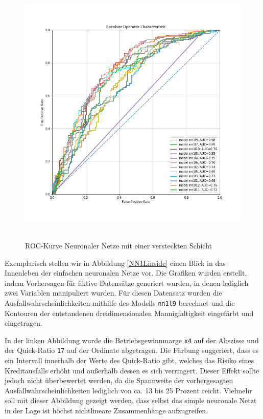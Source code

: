 \documentclass{article}
\begin{document}
\begin{center}
\begin{figure}[ht]
\centering
\caption{ROC-Kurve Neuronaler Netze mit einer versteckten Schicht}
\label{rocNN1L}
\includegraphics[width=15cm, height=13cm]{../rocNN1L.png}
\end{figure}
\end{center}


Exemplarisch stellen wir in Abbildung \ref{NN1Linside} einen Blick in das Innenleben der einfachen neuronalen Netze vor. Die Grafiken wurden erstellt, indem Vorhersagen f{\"u}r fiktive Datens{\"a}tze generiert wurden, in denen lediglich zwei Variablen manipuliert wurden. F{\"u}r diesen Datensatz wurden die Ausfallwahrscheinlichkeiten mithilfe des Modells \texttt{nn1l9} berechnet und die Kontouren der entstandenen dreidimensionalen Mannigfaltigkeit eingef{\"a}rbt und eingetragen.

In der linken Abbildung wurde die Betriebsgewinnmarge \texttt{x4} auf der Abszisse und der Quick-Ratio \texttt{17} auf der Ordinate abgetragen. Die F{\"a}rbung suggeriert, dass es ein Intervall innerhalb der Werte des Quick-Ratio gibt, welches das Risiko eines Kreditausfalls erh{\"o}ht und au{\ss}erhalb dessen es sich verringert. Dieser Effekt sollte jedoch nicht {\"u}berbewertet werden, da die Spannweite der vorhergesagten Ausfallwahrscheinlichkeiten lediglich von ca. 13 bis 25 Prozent reicht. Vielmehr soll mit dieser Abbildung gezeigt werden, dass selbst das simple neuronale Netzt in der Lage ist h{\"o}chst nichtlineare Zusammenh{\"a}nge aufzugreifen.
\end{document}

